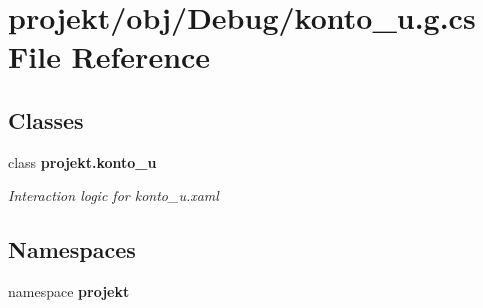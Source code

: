 \section{projekt/obj/\+Debug/konto\+\_\+u.g.\+cs File Reference}
\label{Debug_2konto__u_8g_8cs}
\subsection*{Classes}
\begin{DoxyCompactItemize}
\item 
class \textbf{ projekt.\+konto\+\_\+u}
\begin{DoxyCompactList}\small\item\em Interaction logic for konto\+\_\+u.\+xaml \end{DoxyCompactList}\end{DoxyCompactItemize}
\subsection*{Namespaces}
\begin{DoxyCompactItemize}
\item 
namespace \textbf{ projekt}
\end{DoxyCompactItemize}
